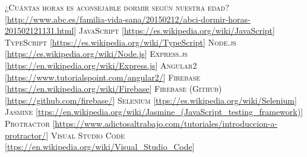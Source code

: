 \documentclass[11pt,openany]{book}
\begin{document}
\begin{thebibliography}{References}
 \textsc{¿Cuántas horas es aconsejable dormir según nuestra edad?} [\url{http://www.abc.es/familia-vida-sana/20150212/abci-dormir-horas-201502121131.html}]
 \textsc{JavaScript} [\url{https://es.wikipedia.org/wiki/JavaScript}]
 \textsc{TypeScript} [\url{https://es.wikipedia.org/wiki/TypeScript}]
 \textsc{Node.js} [\url{https://es.wikipedia.org/wiki/Node.js}]
 \textsc{Express.js} [\url{https://en.wikipedia.org/wiki/Express.js}]
 \textsc{Angular2} [\url{https://www.tutorialspoint.com/angular2/}]
 \textsc{Firebase} [\url{https://en.wikipedia.org/wiki/Firebase}]
 \textsc{Firebase (Github)} [\url{https://github.com/firebase/}]
 \textsc{Selenium} [\url{ttps://es.wikipedia.org/wiki/Selenium}]
 \textsc{Jasmine} [\url{ttps://en.wikipedia.org/wiki/Jasmine_(JavaScript_testing_framework)}]
 \textsc{Protractor} [\url{https://www.adictosaltrabajo.com/tutoriales/introduccion-a-protractor/}]
 \textsc{Visual Studio Code} [\url{ttps://en.wikipedia.org/wiki/Visual_Studio_Code}]
\end{thebibliography}

\appendix %
\printnotes*
\end{document}
